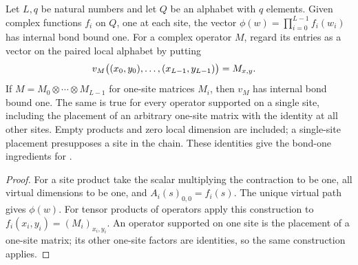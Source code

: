 \begin{lemma}
    \label{thm:chain_site_product_mps}
    \leanok
    Let $L,q$ be natural numbers and let $Q$ be an alphabet with
    $q$ elements. Given complex functions $f_i$ on $Q$, one at each site, the vector
    $\phi(w)=\prod_{i=0}^{L-1}f_i(w_i)$ has internal bond bound one.
    For a complex operator $M$, regard its entries as a vector on the
    paired local alphabet by putting
    \begin{align}
        v_M\bigl((x_0,y_0),\ldots,(x_{L-1},y_{L-1})\bigr)
         & =M_{x,y}. \notag
    \end{align}
    If $M=M_0\otimes\cdots\otimes M_{L-1}$ for one-site matrices
    $M_i$, then $v_M$ has internal bond bound one. The same is true
    for every operator supported on a single site, including the
    placement of an arbitrary one-site matrix with the identity at
    all other sites. Empty products and zero local dimension are
    included; a single-site placement presupposes a site in the chain.
    These identities give the bond-one ingredients for
    \cite[Proposition~5.7]{Arad2016RigorousRG}.
\end{lemma}
\begin{proof}\leanok
    For a site product take the scalar multiplying the contraction
    to be one, all virtual dimensions to be one, and
    $A_i(s)_{0,0}=f_i(s)$. The unique virtual path gives $\phi(w)$.
    For tensor products of operators apply this construction to
    $f_i(x_i,y_i)=(M_i)_{x_i,y_i}$. An operator supported on one site
    is the placement of a one-site matrix; its other one-site factors
    are identities, so the same construction applies.
\end{proof}

